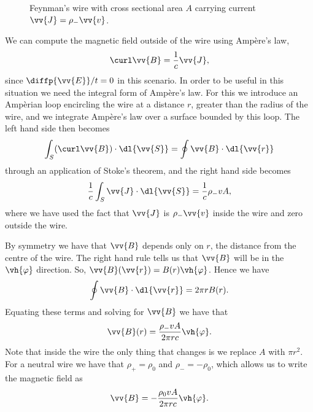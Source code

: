 \begin{figure}
    \caption[Feynman's Wire]{Feynman's wire with cross sectional area \(A\) carrying current \(\vv{J} = \rho_-\vv{v}\).}
\end{figure}

We can compute the magnetic field outside of the wire using Amp\`ere's law,
\begin{equation}
    \curl\vv{B} = \frac{1}{c}\vv{J},
\end{equation}
since \(\diffp{\vv{E}}/{t} = 0\) in this scenario.
In order to be useful in this situation we need the integral form of Amp\`ere's law.
For this we introduce an Amp\`erian loop encircling the wire at a distance \(r\), greater than the radius of the wire, and we integrate Amp\`ere's law over a surface bounded by this loop.
The left hand side then becomes
\begin{equation}
    \int_S (\curl\vv{B}) \cdot \dl{\vv{S}} = \oint \vv{B} \cdot \dl{\vv{r}}
\end{equation}
through an application of Stoke's theorem, and the right hand side becomes
\begin{equation}
    \frac{1}{c}\int_S \vv{J} \cdot \dl{\vv{S}} = \frac{1}{c}\rho_-vA,
\end{equation}
where we have used the fact that \(\vv{J}\) is \(\rho_-\vv{v}\) inside the wire and zero outside the wire.

By symmetry we have that \(\vv{B}\) depends only on \(r\), the distance from the centre of the wire.
The right hand rule tells us that \(\vv{B}\) will be in the \(\vh{\varphi}\) direction.
So, \(\vv{B}(\vv{r}) = B(r)\vh{\varphi}\).
Hence we have
\begin{equation}
    \oint \vv{B} \cdot \dl{\vv{r}} = 2\pi r B(r).
\end{equation}
Equating these terms and solving for \(\vv{B}\) we have that
\begin{equation}
    \vv{B}(r) = \frac{\rho_-vA}{2\pi r c}\vh{\varphi}.
\end{equation}
Note that inside the wire the only thing that changes is we replace \(A\) with \(\pi r^2\).
For a neutral wire we have that \(\rho_+ = \rho_0\) and \(\rho_- = -\rho_0\), which allows us to write the magnetic field as
\begin{equation}
    \vv{B} = -\frac{\rho_0vA}{2\pi r c}\vh{\varphi}.
\end{equation}

